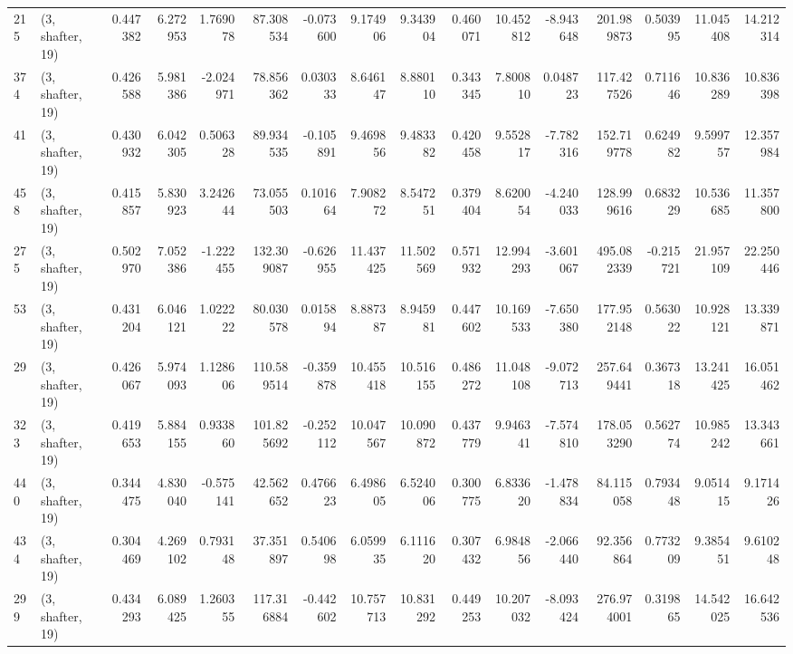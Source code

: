 \begin{tabular}{llrrrrrrrrrrrrrr}
215 &  (3, shafter, 19) &   0.447382 &   6.272953 &   1.769078 &    87.308534 &  -0.073600 &   9.174906 &   9.343904 &  0.460071 &  10.452812 &  -8.943648 &   201.989873 &   0.503995 &  11.045408 &  14.212314 \\
374 &  (3, shafter, 19) &   0.426588 &   5.981386 &  -2.024971 &    78.856362 &   0.030333 &   8.646147 &   8.880110 &  0.343345 &   7.800810 &   0.048723 &   117.427526 &   0.711646 &  10.836289 &  10.836398 \\
41  &  (3, shafter, 19) &   0.430932 &   6.042305 &   0.506328 &    89.934535 &  -0.105891 &   9.469856 &   9.483382 &  0.420458 &   9.552817 &  -7.782316 &   152.719778 &   0.624982 &   9.599757 &  12.357984 \\
458 &  (3, shafter, 19) &   0.415857 &   5.830923 &   3.242644 &    73.055503 &   0.101664 &   7.908272 &   8.547251 &  0.379404 &   8.620054 &  -4.240033 &   128.999616 &   0.683229 &  10.536685 &  11.357800 \\
275 &  (3, shafter, 19) &   0.502970 &   7.052386 &  -1.222455 &   132.309087 &  -0.626955 &  11.437425 &  11.502569 &  0.571932 &  12.994293 &  -3.601067 &   495.082339 &  -0.215721 &  21.957109 &  22.250446 \\
53  &  (3, shafter, 19) &   0.431204 &   6.046121 &   1.022222 &    80.030578 &   0.015894 &   8.887387 &   8.945981 &  0.447602 &  10.169533 &  -7.650380 &   177.952148 &   0.563022 &  10.928121 &  13.339871 \\
29  &  (3, shafter, 19) &   0.426067 &   5.974093 &   1.128606 &   110.589514 &  -0.359878 &  10.455418 &  10.516155 &  0.486272 &  11.048108 &  -9.072713 &   257.649441 &   0.367318 &  13.241425 &  16.051462 \\
323 &  (3, shafter, 19) &   0.419653 &   5.884155 &   0.933860 &   101.825692 &  -0.252112 &  10.047567 &  10.090872 &  0.437779 &   9.946341 &  -7.574810 &   178.053290 &   0.562774 &  10.985242 &  13.343661 \\
440 &  (3, shafter, 19) &   0.344475 &   4.830040 &  -0.575141 &    42.562652 &   0.476623 &   6.498605 &   6.524006 &  0.300775 &   6.833620 &  -1.478834 &    84.115058 &   0.793448 &   9.051415 &   9.171426 \\
434 &  (3, shafter, 19) &   0.304469 &   4.269102 &   0.793148 &    37.351897 &   0.540698 &   6.059935 &   6.111620 &  0.307432 &   6.984856 &  -2.066440 &    92.356864 &   0.773209 &   9.385451 &   9.610248 \\
299 &  (3, shafter, 19) &   0.434293 &   6.089425 &   1.260355 &   117.316884 &  -0.442602 &  10.757713 &  10.831292 &  0.449253 &  10.207032 &  -8.093424 &   276.974001 &   0.319865 &  14.542025 &  16.642536 \\

\end{tabular}
